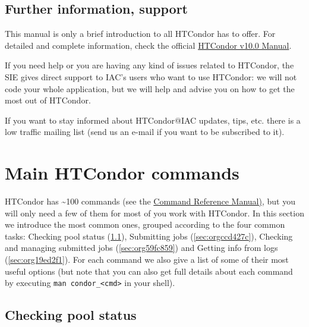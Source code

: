 \documentclass[a4paper,10pt]{article}
\begin{document}
\subsection{Further information, support}
\label{sec:orgb6199c2}

This manual is only a brief introduction to all HTCondor has to offer. For
detailed and complete information, check the official \href{https://htcondor.readthedocs.io/en/v10\_0/}{HTCondor v10.0 Manual}.

If you need help or you are having any kind of issues related to HTCondor,
the SIE gives direct support to IAC's users who want to use HTCondor: we
will not code your whole application, but we will help and advise you on how to
get the most out of HTCondor. 

If you want to stay informed about HTCondor@IAC updates, tips, etc. there is a
low traffic mailing list (send us an e-mail if you want to be subscribed to it).


\section{Main HTCondor commands}
\label{sec:org5dc7fd6}

HTCondor has \textasciitilde{}100 commands (see the \href{https://htcondor.readthedocs.io/en/v10\_0/man-pages/index.html}{Command Reference Manual)}, but you will only
need a few of them for most of you work with HTCondor. In this section we
introduce the most common ones, grouped according to the four common tasks:
Checking pool status (\ref{sec:org1d0a77c}), Submitting jobs (\ref{sec:orgccd427c}), Checking and managing submitted jobs (\ref{sec:org59fc859}) and Getting info from logs (\ref{sec:org19ed2f1}). For each command we
also give a list of some of their most useful options (but note that you can
also get full details about each command by executing \texttt{man condor\_<cmd>} in your
shell).

\subsection{Checking pool status}
\label{sec:org1d0a77c}
\end{document}
